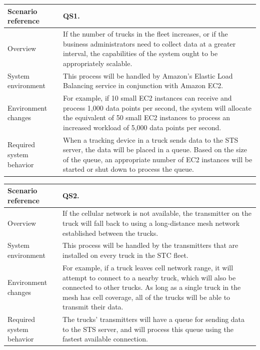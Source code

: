 \documentclass[a4paper,11pt]{report}
\begin{document}
\begin{center}
  \begin{tabular}[h!]{| >{\columncolor{gray}}p{} | p{} |}
    \hline
    Scenario reference & QS1. \\
    \hline
    Overview & If the number of trucks in the fleet increases, or if the business
    administrators need to collect data at a greater interval, the capabilities
    of the system ought to be appropriately scalable.\\
    \hline
    System environment & This process will be handled
    by Amazon's Elastic Load Balancing service in conjunction with Amazon EC2.\\
    \hline
    Environment changes & For example, if 10 small EC2
    instances can receive and process 1,000 data points per second, the system will
    allocate the equivalent of 50 small EC2 instances to process an increased
    workload of 5,000 data points per second.\\
    \hline
    Required system behavior & When a tracking device in
    a truck sends data to the STS server, the data will be placed in a queue.
    Based on the size of the queue, an appropriate number of EC2 instances will
    be started or shut down to process the queue.\\
    \hline
  \end{tabular}
\end{center}

\begin{center}
  \begin{tabular}[h!]{| >{\columncolor{gray}}p{} | p{} |}
    \hline
    Scenario reference & QS2. \\
    \hline
    Overview & If the cellular network is not available, the transmitter on the
    truck will fall back to using a long-distance mesh network established
    between the trucks. \\
    \hline
    System environment & This process will be handled
    by the transmitters that are installed on every truck in the STC fleet.\\
    \hline
    Environment changes & For example, if a truck leaves cell network range, it
    will attempt to connect to a nearby truck, which will also be connected to
    other trucks. As long as a single truck in the mesh has cell coverage, all
    of the trucks will be able to transmit their data.\\
    \hline
    Required system behavior & The trucks' transmitters will have a queue for
    sending data to the STS server, and will process this queue using the
    fastest available connection.\\
    \hline
  \end{tabular}
\end{center}
\end{document}

